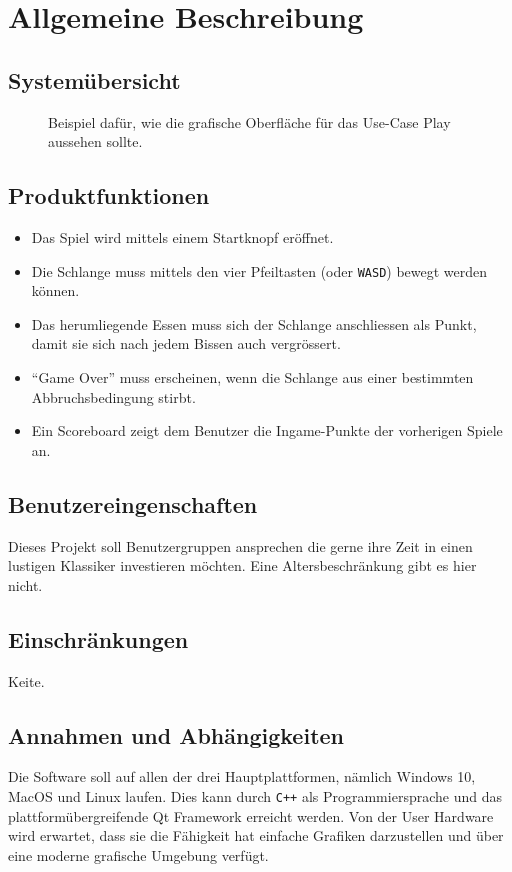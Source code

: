 \documentclass[a4paper, twosided, 11pt]{scrartcl}
\begin{document}
\section{Allgemeine Beschreibung}
\subsection{System\"ubersicht}
\begin{figure}[H]
  \centering
  
  \caption[Beispiel f\"ur grafische Oberfl\"ache in Use Case Play]{Beispiel dafür, wie die grafische Oberfläche f\"ur das Use-Case Play aussehen sollte.}
\end{figure}

\subsection{Produktfunktionen} \label{sec:product-functions}
\begin{itemize}
  \item Das Spiel wird mittels einem Startknopf eröffnet.

  \item Die Schlange muss mittels den vier Pfeiltasten (oder \texttt{WASD})
    bewegt werden können.

  \item Das herumliegende Essen muss sich der Schlange anschliessen als Punkt,
    damit sie sich nach jedem Bissen auch vergrössert.

  \item ``Game Over'' muss erscheinen, wenn die Schlange aus einer bestimmten
    Abbruchsbedingung stirbt.

  \item Ein Scoreboard zeigt dem Benutzer die Ingame-Punkte der vorherigen Spiele an.
\end{itemize}

\subsection{Benutzereingenschaften}
Dieses Projekt soll Benutzergruppen ansprechen die gerne ihre Zeit in einen
lustigen Klassiker investieren möchten. Eine Altersbeschränkung gibt es hier
nicht.

\subsection{Einschr\"ankungen}
Keite.

\subsection{Annahmen und Abh\"angigkeiten}
Die Software soll auf allen der drei Hauptplattformen, nämlich Windows 10,
MacOS und Linux laufen. Dies kann durch \texttt{C++} als Programmiersprache und
das plattformübergreifende Qt Framework erreicht werden. Von der User Hardware
wird erwartet, dass sie die Fähigkeit hat einfache Grafiken darzustellen und
über eine moderne grafische Umgebung verfügt.
\end{document}
